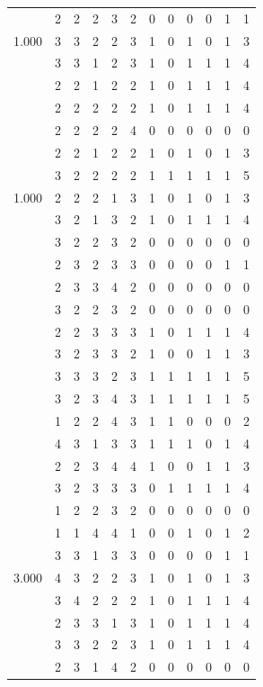 \documentclass[]{msu-thesis}
\theoremstyle{definition}
\theoremstyle{definition}
\theoremstyle{definition}
\theoremstyle{remark}
\begin{document}
\begin{table}
{\begin{tabular}[t]{rrrrrrrrrrrr}
 & 2 & 2 & 2 & 3 & 2 & 0 & 0 & 0 & 0 & 1 & 1\\
1.000 & 3 & 3 & 2 & 2 & 3 & 1 & 0 & 1 & 0 & 1 & 3\\
 & 3 & 3 & 1 & 2 & 3 & 1 & 0 & 1 & 1 & 1 & 4\\
 & 2 & 2 & 1 & 2 & 2 & 1 & 0 & 1 & 1 & 1 & 4\\
 & 2 & 2 & 2 & 2 & 2 & 1 & 0 & 1 & 1 & 1 & 4\\
 & 2 & 2 & 2 & 2 & 4 & 0 & 0 & 0 & 0 & 0 & 0\\
 & 2 & 2 & 1 & 2 & 2 & 1 & 0 & 1 & 0 & 1 & 3\\
 & 3 & 2 & 2 & 2 & 2 & 1 & 1 & 1 & 1 & 1 & 5\\
1.000 & 2 & 2 & 2 & 1 & 3 & 1 & 0 & 1 & 0 & 1 & 3\\
 & 3 & 2 & 1 & 3 & 2 & 1 & 0 & 1 & 1 & 1 & 4\\
 & 3 & 2 & 2 & 3 & 2 & 0 & 0 & 0 & 0 & 0 & 0\\
 & 2 & 3 & 2 & 3 & 3 & 0 & 0 & 0 & 0 & 1 & 1\\
 & 2 & 3 & 3 & 4 & 2 & 0 & 0 & 0 & 0 & 0 & 0\\
 & 3 & 2 & 2 & 3 & 2 & 0 & 0 & 0 & 0 & 0 & 0\\
 & 2 & 2 & 3 & 3 & 3 & 1 & 0 & 1 & 1 & 1 & 4\\
 & 3 & 2 & 3 & 3 & 2 & 1 & 0 & 0 & 1 & 1 & 3\\
 & 3 & 3 & 3 & 2 & 3 & 1 & 1 & 1 & 1 & 1 & 5\\
 & 3 & 2 & 3 & 4 & 3 & 1 & 1 & 1 & 1 & 1 & 5\\
 & 1 & 2 & 2 & 4 & 3 & 1 & 1 & 0 & 0 & 0 & 2\\
 & 4 & 3 & 1 & 3 & 3 & 1 & 1 & 1 & 0 & 1 & 4\\
 & 2 & 2 & 3 & 4 & 4 & 1 & 0 & 0 & 1 & 1 & 3\\
 & 3 & 2 & 3 & 3 & 3 & 0 & 1 & 1 & 1 & 1 & 4\\
 & 1 & 2 & 2 & 3 & 2 & 0 & 0 & 0 & 0 & 0 & 0\\
 & 1 & 1 & 4 & 4 & 1 & 0 & 0 & 1 & 0 & 1 & 2\\
 & 3 & 3 & 1 & 3 & 3 & 0 & 0 & 0 & 0 & 1 & 1\\
3.000 & 4 & 3 & 2 & 2 & 3 & 1 & 0 & 1 & 0 & 1 & 3\\
 & 3 & 4 & 2 & 2 & 2 & 1 & 0 & 1 & 1 & 1 & 4\\
 & 2 & 3 & 3 & 1 & 3 & 1 & 0 & 1 & 1 & 1 & 4\\
 & 3 & 3 & 2 & 2 & 3 & 1 & 0 & 1 & 1 & 1 & 4\\
 & 2 & 3 & 1 & 4 & 2 & 0 & 0 & 0 & 0 & 0 & 0\\

\end{tabular}}
\end{table}
\end{document}
